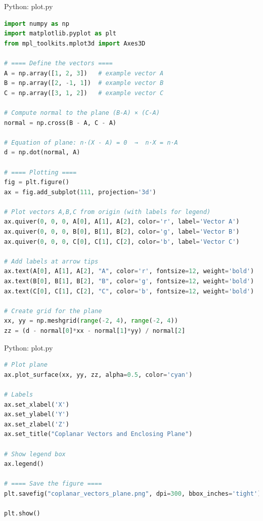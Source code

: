 \documentclass{beamer}
\numberwithin{equation}{section}
\theoremstyle{remark}
\begin{document}
\begin{frame}[fragile]{Python: plot.py}
\begin{lstlisting}[language=Python]
 import numpy as np
import matplotlib.pyplot as plt
from mpl_toolkits.mplot3d import Axes3D

# ==== Define the vectors ====
A = np.array([1, 2, 3])   # example vector A
B = np.array([2, -1, 1])  # example vector B
C = np.array([3, 1, 2])   # example vector C

# Compute normal to the plane (B-A) × (C-A)
normal = np.cross(B - A, C - A)

# Equation of plane: n·(X - A) = 0  →  n·X = n·A
d = np.dot(normal, A)

# ==== Plotting ====
fig = plt.figure()
ax = fig.add_subplot(111, projection='3d')

# Plot vectors A,B,C from origin (with labels for legend)
ax.quiver(0, 0, 0, A[0], A[1], A[2], color='r', label='Vector A')
ax.quiver(0, 0, 0, B[0], B[1], B[2], color='g', label='Vector B')
ax.quiver(0, 0, 0, C[0], C[1], C[2], color='b', label='Vector C')

# Add labels at arrow tips
ax.text(A[0], A[1], A[2], "A", color='r', fontsize=12, weight='bold')
ax.text(B[0], B[1], B[2], "B", color='g', fontsize=12, weight='bold')
ax.text(C[0], C[1], C[2], "C", color='b', fontsize=12, weight='bold')

# Create grid for the plane
xx, yy = np.meshgrid(range(-2, 4), range(-2, 4))
zz = (d - normal[0]*xx - normal[1]*yy) / normal[2]
\end{lstlisting}
\end{frame} 

\begin{frame}[fragile]{Python: plot.py}
\begin{lstlisting}[language=Python]
# Plot plane
ax.plot_surface(xx, yy, zz, alpha=0.5, color='cyan')

# Labels
ax.set_xlabel('X')
ax.set_ylabel('Y')
ax.set_zlabel('Z')
ax.set_title("Coplanar Vectors and Enclosing Plane")

# Show legend box
ax.legend()

# ==== Save the figure ====
plt.savefig("coplanar_vectors_plane.png", dpi=300, bbox_inches='tight')

plt.show()

\end{lstlisting}
\end{frame} 
\end{document}

